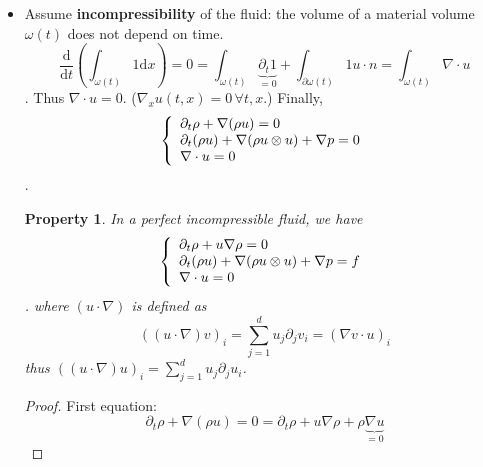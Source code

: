 \documentclass{report}
\theoremstyle{plain}
\newtheorem{prop}{Property}
\theoremstyle{definition}
\theoremstyle{remark}
\begin{document}
\begin{itemize}
\item Assume \textbf{incompressibility} of the fluid: the
	volume of a material volume $\omega(t)$ does not 
	depend on time.
	$$\frac{\text{d}}{\text{d}t}(\int_{\omega(t)} 1 
	\text{d}x) = 0 =\int_{\omega(t)} \underbrace{
	\partial_t 1}_{=0} + \int_{\partial\omega(t)} 1 u 
	\cdot n = \int_{\omega(t)} \nabla\cdot u$$.
	Thus $\nabla\cdot u = 0$. ($\nabla_x u(t,x) = 0\,
	\forall t, x$.)
	Finally,
	\begin{equation}
		\left\lbrace
		\begin{array}[]{l}
			\partial_t \rho +\nabla(\rho u )=0\\
			\partial_t(\rho u ) +\nabla
			(\rho u\otimes u ) +\nabla p
			= 0\\
			\nabla\cdot u = 0
		\end{array}\right.
	\end{equation}.
\begin{prop}
	In a perfect incompressible fluid, we have
	\begin{equation}
		\left\lbrace
		\begin{array}[]{l}
			\partial_t \rho + u \nabla\rho=0\\
			\partial_t(\rho u ) +\nabla
			(\rho u\otimes u ) +\nabla p
			= f\\
			\nabla\cdot u = 0
		\end{array}\right.
	\end{equation}.
	where $(u\cdot\nabla)$ is defined as
	$$((u\cdot\nabla)v)_i 
	=\sum_{j=1}^d u_j\partial_jv_i
	= (\nabla v \cdot u )_i$$
	thus
	$((u\cdot\nabla)u)_i 
	=\sum_{j=1}^d u_j\partial_ju_i$.
\end{prop}

\begin{proof}
	First equation:
	$$\partial_t\rho +\nabla(\rho u) = 0 
	= \partial_t\rho + u\nabla\rho + \rho
	\underbrace{\nabla u}_{=0}$$


\end{proof}
\end{itemize}
\end{document}
